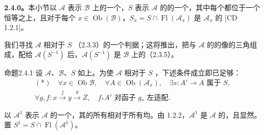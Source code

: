 \textbf{2.4.0。}本小节以 $\mathcal A$ 表示 $\mathcal B$ 上的一个，$S$ 表示 $\mathcal A$ 的的一个，其中每个都位于一个恒等之上，且对于每个 $x\in\operatorname{Ob}(\mathcal B)$，$S_x=S\cap\operatorname{Fl}(\mathcal A_x)$ 是 $\mathcal A_x$ 的 [CD 1.2.1]。

我们寻找 $\mathcal A$ 相对于 $S$ （2.3.3）的一个判据；这将推出，把与 $\mathcal A$ 的的像的三角组成，配给 $\mathcal A(S^{-1})$ 后，$\mathcal A(S^{-1})$ 是 $\mathcal B$ 上的（2.3.5）。

\begin{SGAresult}{命题}{2.4.1}
设 $\mathcal A$、$\mathcal B$、$S$ 如上。为使 $\mathcal A$ 相对于 $S$ ，下述条件成立即已足够：
\[
\begin{gathered}
(*)\quad\forall x\in\operatorname{Ob}\mathcal B,\quad\forall A\in\operatorname{Ob}(\mathcal A_x),\quad\exists s:A'\to A\text{ 属于 }S,\\
\forall g,f:x\xrightarrow{f}y\xrightarrow{g}Z,\quad
f_*A'\text{ 对函子 }g_*\text{ 左适配}.
\end{gathered}
\]
\end{SGAresult}
以 $\mathcal A^1$ 表示 $\mathcal A$ 的一个，其的所有相对于所有均。由 1.2.2，$\mathcal A^1$ 是 $\mathcal A$ 的，且显然。置 $S^1=S\cap\operatorname{Fl}(\mathcal A^1)$。

